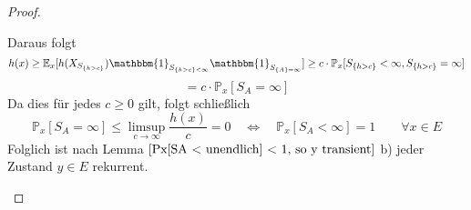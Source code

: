 \documentclass[a4paper,12pt]{scrartcl}
\theoremstyle{definition}
\begin{document}
\begin{proof}
\begin{itemize}
\begin{equation*}
\end{equation*}
Daraus folgt
\begin{equation*}
h(x) \geq \mathbb{E}_{x}[h(X_{S_{{\lbrace h > c \rbrace}}}) \mathbbm{1}_{S_{{\lbrace h > c \rbrace} < \infty}}\mathbbm{1}_{S_{{\lbrace A \rbrace} = \infty}}] \geq c \cdot \mathbb{P}_{x}[S_{{\lbrace h > c \rbrace}} < \infty, S_{{\lbrace h > c \rbrace}} = \infty]
\end{equation*}
\begin{equation*}
= c \cdot \mathbb{P}_{x}[S_{A} = \infty]
\end{equation*}
Da dies für jedes $c \geq 0$ gilt, folgt schließlich
\begin{equation*}
\mathbb{P}_{x}[S_{A} = \infty] \leq \limsup_{c \to \infty} \dfrac{h(x)}{c} = 0 \quad \Leftrightarrow \quad \mathbb{P}_{x}[S_{A} < \infty] = 1 \qquad \forall x \in E
\end{equation*}
Folglich ist nach Lemma $\ref{Px[SA < unendlich] < 1, so y transient}$ b) jeder Zustand $y \in E$ rekurrent.
\end{itemize}
\end{proof}
\end{document}

